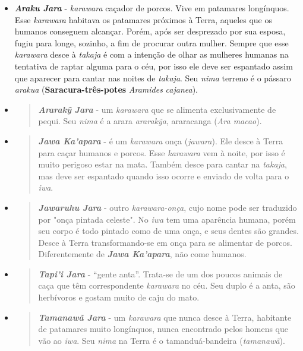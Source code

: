 \begin{itemize}
\item
  \emph{\textbf{Araku Jara}} - \emph{karawara} caçador de porcos. Vive
  em patamares longínquos. Esse \emph{karawara} habitava os patamares
  próximos à Terra, aqueles que os humanos conseguem alcançar. Porém,
  após ser desprezado por sua esposa, fugiu para longe, sozinho, a fim
  de procurar outra mulher. Sempre que esse \emph{karawara} desce à
  \emph{takaja} é com a intenção de olhar as mulheres humanas na
  tentativa de raptar alguma para o céu, por isso ele deve ser espantado
  assim que aparecer para cantar nas noites de \emph{takaja}. Seu
  \emph{nima} terreno é o pássaro \emph{arakua}
  (\textbf{Saracura-três-potes} \emph{Aramides} \emph{cajanea}).
\item
  \begin{quote}
  \textbf{\emph{Ararakỹ} \emph{Jara}} - um \emph{karawara} que se
  alimenta exclusivamente de pequi. Seu \emph{nima} é a arara
  \emph{ararakỹa}, araracanga (\emph{Ara macao}).
  \end{quote}
\item
  \begin{quote}
  \emph{\textbf{Jawa Ka'apara}} - é um \emph{karawara} onça
  (\emph{jawara}). Ele desce à Terra para caçar humanos e porcos. Esse
  \emph{karawara} vem à noite, por isso é muito perigoso estar na mata.
  Também desce para cantar na \emph{takaja}, mas deve ser espantado
  quando isso ocorre e enviado de volta para o \emph{iwa}.
  \end{quote}
\item
  \begin{quote}
  \emph{\textbf{Jawaruhu Jara}} - outro \emph{karawara-onça}, cujo nome
  pode ser traduzido por "onça pintada celeste". No \emph{iwa} tem uma
  aparência humana, porém seu corpo é todo pintado como de uma onça, e
  seus dentes são grandes. Desce à Terra transformando-se em onça para
  se alimentar de porcos. Diferentemente de \emph{\textbf{Jawa
  Ka'apara}}, não come humanos.
  \end{quote}
\item
  \begin{quote}
  \emph{\textbf{Tapi'i Jara}} - ``gente anta''. Trata-se de um dos
  poucos animais de caça que têm correspondente \emph{karawara} no céu.
  Seu duplo é a anta, são herbívoros e gostam muito de caju do mato.
  \end{quote}
\item
  \begin{quote}
  \emph{\textbf{Tamanawã Jara}} - um \emph{karawara} que nunca desce à
  Terra, habitante de patamares muito longínquos, nunca encontrado pelos
  homens que vão ao \emph{iwa}. Seu \emph{nima} na Terra é o
  tamanduá-bandeira (\emph{tamanawã}).
  \end{quote}
\end{itemize}

